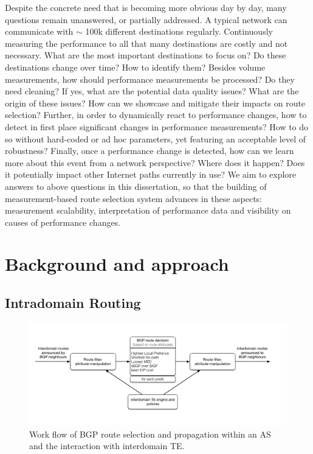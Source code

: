 Despite the concrete need that is becoming more obvious day by day, many questions remain unanswered, or partially addressed.
A typical network can communicate with $\sim$ 100k different destinations regularly. 
Continuously measuring the performance to all that many destinations are costly and not necessary. 
What are the most important destinations to focus on? Do these destinations change over time? How to identify them?
Besides volume measurements, how should performance measurements be processed? Do they need cleaning?
If yes, what are the potential data quality issues? What are the origin of these issues? How can we showcase and mitigate their impacts on route selection?
Further, in order to dynamically react to performance changes, how to detect in first place significant changes in performance measurements? How to do so without hard-coded or ad hoc parameters, yet featuring an acceptable level of robustness?
Finally, once a performance change is detected, how can we learn more about this event from a network perspective? Where does it happen? Does it potentially impact other Internet paths currently in use? 
We aim to explore answers to above questions in this dissertation, so that the building of measurement-based route selection system advances in these aspects: measurement scalability, interpretation of performance data and visibility on causes of performance changes. 

\chapter{Background and approach}
\section{Intradomain Routing}
\begin{figure}[!htb]
\centering
\includegraphics[width=1.3\textwidth]{gfx/chap1/bgp_decision.pdf}
\caption{Work flow of \ac{BGP} route selection and propagation within an \ac{AS} and the interaction with interdomain \ac{TE}.}
\label{fig:bgp_decision}
\end{figure}


